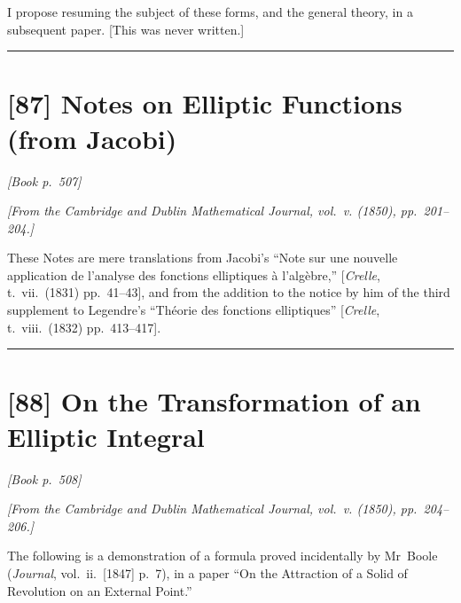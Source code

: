 \documentclass[11pt]{article}
\begin{document}
I propose resuming the subject of these forms, and the general theory, in a subsequent paper. [This was never written.]

\bigskip
\hrule
\bigskip


\section*{[87] Notes on Elliptic Functions (from Jacobi)}

\noindent\textit{[Book p.~507]}\hfill

\smallskip

\noindent\emph{[From the Cambridge and Dublin Mathematical Journal, vol.~v. (1850), pp.~201--204.]}

\medskip

\noindent These Notes are mere translations from Jacobi's ``Note sur une nouvelle application de l'analyse des fonctions elliptiques \`a l'alg\`ebre,'' [\emph{Crelle}, t.~vii.\ (1831) pp.~41--43], and from the addition to the notice by him of the third supplement to Legendre's ``Th\'eorie des fonctions elliptiques'' [\emph{Crelle}, t.~viii.\ (1832) pp.~413--417].

\bigskip
\hrule
\bigskip


\section*{[88] On the Transformation of an Elliptic Integral}

\noindent\textit{[Book p.~508]}\hfill

\smallskip

\noindent\emph{[From the Cambridge and Dublin Mathematical Journal, vol.~v. (1850), pp.~204--206.]}

\medskip

\noindent The following is a demonstration of a formula proved incidentally by Mr~Boole (\emph{Journal}, vol.~ii.\ [1847] p.~7), in a paper ``On the Attraction of a Solid of Revolution on an External Point.''
\end{document}
